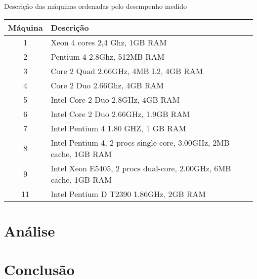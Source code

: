 \documentclass[10pt,a4paper]{article}
\begin{document}
\begin{table}[h!]
{Descrição das máquinas ordenadas pelo desempenho medido}
\begin{tabular}{cl}
\hline
Máquina & Descrição\\
\hline
1	&	  Xeon 4 cores 2,4 Ghz, 1GB RAM\\
2	&	Pentium 4 2.8Ghz, 512MB RAM\\
3	&	Core 2 Quad 2.66GHz, 4MB L2, 4GB RAM\\
4	&	Core 2 Duo 2.66Ghz, 4GB RAM\\
5	&	Intel Core 2 Duo 2.8GHz, 4GB RAM\\
6	&	Intel Core 2 Duo 2.66GHz, 1.9GB RAM\\
7	&	Intel Pentium 4 1.80 GHZ, 1 GB RAM\\
8 &	Intel Pentium 4, 2 procs single-core, 3.00GHz, 2MB cache, 1GB RAM\\
9 &	Intel Xeon E5405, 2 procs dual-core, 2.00GHz, 6MB cache, 1GB RAM\\
11 &	Intel Pentium D T2390 1.86GHz, 2GB RAM\\
\hline
\end{tabular}
\end{table}

\section{Análise}
\section{Conclusão}




\begin{small}
  
\end{small}
\end{document}
